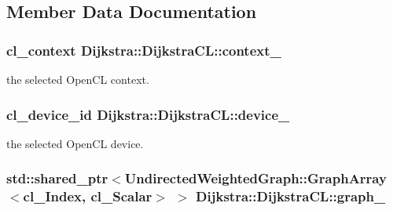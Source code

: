 \subsection{Member Data Documentation}
\hypertarget{class_dijkstra_1_1_dijkstra_c_l_a53f966d6cc79d454cbc48e11467662b4}{
\subsubsection[{context\+\_\+}]{\setlength{\rightskip}{0pt plus 5cm}cl\+\_\+context Dijkstra\+::\+Dijkstra\+C\+L\+::context\+\_\+\hspace{0.3cm}{\ttfamily [private]}}}\label{class_dijkstra_1_1_dijkstra_c_l_a53f966d6cc79d454cbc48e11467662b4}


the selected Open\+C\+L context. 

\hypertarget{class_dijkstra_1_1_dijkstra_c_l_ac848f9681e88c61e339ab6d70bcfacdf}{
\subsubsection[{device\+\_\+}]{\setlength{\rightskip}{0pt plus 5cm}cl\+\_\+device\+\_\+id Dijkstra\+::\+Dijkstra\+C\+L\+::device\+\_\+\hspace{0.3cm}{\ttfamily [private]}}}\label{class_dijkstra_1_1_dijkstra_c_l_ac848f9681e88c61e339ab6d70bcfacdf}


the selected Open\+C\+L device. 

\hypertarget{class_dijkstra_1_1_dijkstra_c_l_a0b851e99d9aed1cc0671fc537efe3a20}{
\subsubsection[{graph\+\_\+}]{\setlength{\rightskip}{0pt plus 5cm}std\+::shared\+\_\+ptr$<${\bf Undirected\+Weighted\+Graph\+::\+Graph\+Array}$<${\bf cl\+\_\+\+Index}, {\bf cl\+\_\+\+Scalar}$>$ $>$ Dijkstra\+::\+Dijkstra\+C\+L\+::graph\+\_\+\hspace{0.3cm}{\ttfamily [private]}}}\label{class_dijkstra_1_1_dijkstra_c_l_a0b851e99d9aed1cc0671fc537efe3a20}


